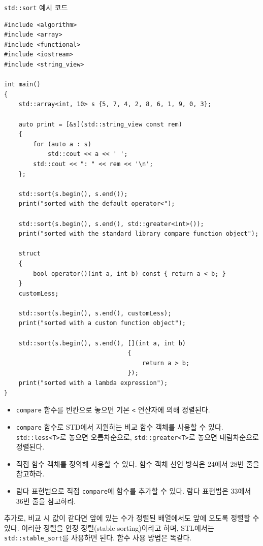 \begin{code} \label{code: stdsort}
\texttt{std::sort} 예시 코드
\begin{lstlisting}
#include <algorithm>
#include <array>
#include <functional>
#include <iostream>
#include <string_view>
 
int main()
{
    std::array<int, 10> s {5, 7, 4, 2, 8, 6, 1, 9, 0, 3};
 
    auto print = [&s](std::string_view const rem)
    {
        for (auto a : s)
            std::cout << a << ' ';
        std::cout << ": " << rem << '\n';
    };
 
    std::sort(s.begin(), s.end());
    print("sorted with the default operator<");
 
    std::sort(s.begin(), s.end(), std::greater<int>());
    print("sorted with the standard library compare function object");
 
    struct
    {
        bool operator()(int a, int b) const { return a < b; }
    }
    customLess;
 
    std::sort(s.begin(), s.end(), customLess);
    print("sorted with a custom function object");
 
    std::sort(s.begin(), s.end(), [](int a, int b)
                                  {
                                      return a > b;
                                  });
    print("sorted with a lambda expression");
}
\end{lstlisting}

\end{code}

\begin{itemize}
    \item \texttt{compare} 함수를 빈칸으로 놓으면 기본 \texttt{<} 연산자에 의해 정렬된다.
    \item \texttt{compare} 함수로 STD에서 지원하는 비교 함수 객체를 사용할 수 있다. \texttt{std::less<T>}로 놓으면 오름차순으로, \texttt{std::greater<T>}로 놓으면 내림차순으로 정렬된다.
    \item 직접 함수 객체를 정의해 사용할 수 있다. 함수 객체 선언 방식은 24에서 28번 줄을 참고하라.
    \item 람다 표현법으로 직접 \texttt{compare}에 함수를 추가할 수 있다. 람다 표현법은 33에서 36번 줄을 참고하라.
\end{itemize}

추가로, 비교 시 값이 같다면 앞에 있는 수가 정렬된 배열에서도 앞에 오도록 정렬할 수 있다. 이러한 정렬을 안정 정렬(stable sorting)이라고 하며, STL에서는 \texttt{std::stable\_sort}를 사용하면 된다. 함수 사용 방법은 똑같다.

